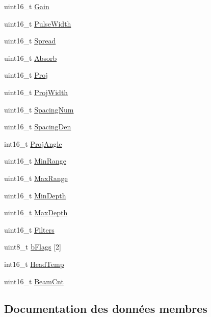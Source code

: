 \begin{DoxyCompactItemize}
\item 
uint16\+\_\+t \hyperlink{structSNP0_aba161dd31bd98e9cc88304d1b227c6fb}{Gain}
\item 
uint16\+\_\+t \hyperlink{structSNP0_a56e19234d0745ef534a29bd314114dd1}{Pulse\+Width}
\item 
uint16\+\_\+t \hyperlink{structSNP0_abf8caba4fc96eec014c47047358d7727}{Spread}
\item 
uint16\+\_\+t \hyperlink{structSNP0_ac1b74212076ec40d2652abdff2ce2ad3}{Absorb}
\item 
uint16\+\_\+t \hyperlink{structSNP0_ab5b89bdac9c2bd9fdf71ab133ad53552}{Proj}
\item 
uint16\+\_\+t \hyperlink{structSNP0_a33535554e463b4cc78628e37b1acd0c4}{Proj\+Width}
\item 
uint16\+\_\+t \hyperlink{structSNP0_a2147bcebb42440050366b57709ad53e5}{Spacing\+Num}
\item 
uint16\+\_\+t \hyperlink{structSNP0_aaa687482640087e282cf75e26ee67d83}{Spacing\+Den}
\item 
int16\+\_\+t \hyperlink{structSNP0_a020495ec71e847c17c02a3643df5829b}{Proj\+Angle}
\item 
uint16\+\_\+t \hyperlink{structSNP0_a671b6f588d5aecfd2b9001899bcd9fff}{Min\+Range}
\item 
uint16\+\_\+t \hyperlink{structSNP0_ab4fe2a839a62b29dfd787fdc096d7948}{Max\+Range}
\item 
uint16\+\_\+t \hyperlink{structSNP0_aae9f0a30189d0282fc71c2b0f3ac2115}{Min\+Depth}
\item 
uint16\+\_\+t \hyperlink{structSNP0_abaaecae3da038633e9d1833699789632}{Max\+Depth}
\item 
uint16\+\_\+t \hyperlink{structSNP0_a5e467787df838b60faa5094f7348633e}{Filters}
\item 
uint8\+\_\+t \hyperlink{structSNP0_a57fc117609cb0851f2e09fe313605eb4}{b\+Flags} \mbox{[}2\mbox{]}
\item 
int16\+\_\+t \hyperlink{structSNP0_a0bc29ffc0f2d8ea4cceb392429fab0e3}{Head\+Temp}
\item 
uint16\+\_\+t \hyperlink{structSNP0_a801bf122ae734d79fe78d65b7a007f87}{Beam\+Cnt}
\end{DoxyCompactItemize}


\subsection{Documentation des données membres}
\mbox{\label{structSNP0_ac1b74212076ec40d2652abdff2ce2ad3}} 
